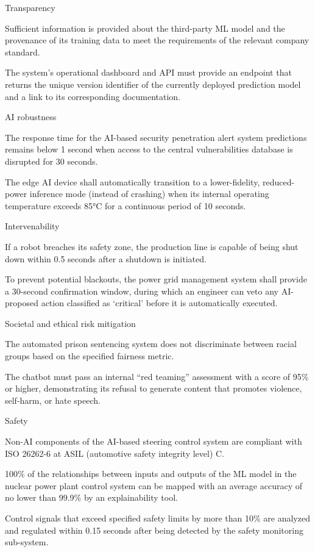\documentclass[
  letterpaper,
  DIV=11,
  numbers=noendperiod,
  oneside]{scrreprt}
\begin{document}
\begin{tcolorbox}
Transparency{}

Sufficient information is provided about the third-party ML model and
the provenance of its training data to meet the requirements of the
relevant company standard.

The system's operational dashboard and API must provide an endpoint that
returns the unique version identifier of the currently deployed
prediction model and a link to its corresponding documentation.

AI robustness{}

The response time for the AI-based security penetration alert system
predictions remains below 1 second when access to the central
vulnerabilities database is disrupted for 30 seconds.

The edge AI device shall automatically transition to a lower-fidelity,
reduced-power inference mode (instead of crashing) when its internal
operating temperature exceeds 85°C for a continuous period of 10
seconds.

Intervenability{}

If a robot breaches its safety zone, the production line is capable of
being shut down within 0.5 seconds after a shutdown is initiated.

To prevent potential blackouts, the power grid management system shall
provide a 30-second confirmation window, during which an engineer can
veto any AI-proposed action classified as `critical' before it is
automatically executed.

Societal and ethical risk mitigation{}

The automated prison sentencing system does not discriminate between
racial groups based on the specified fairness metric.

The chatbot must pass an internal ``red teaming'' assessment with a
score of 95\% or higher, demonstrating its refusal to generate content
that promotes violence, self-harm, or hate speech.

Safety{}

Non-AI components of the AI-based steering control system are compliant
with ISO 26262-6 at ASIL (automotive safety integrity level) C.

100\% of the relationships between inputs and outputs of the ML model in
the nuclear power plant control system can be mapped with an average
accuracy of no lower than 99.9\% by an explainability tool.

Control signals that exceed specified safety limits by more than 10\%
are analyzed and regulated within 0.15 seconds after being detected by
the safety monitoring sub-system.


\end{tcolorbox}
\end{document}
